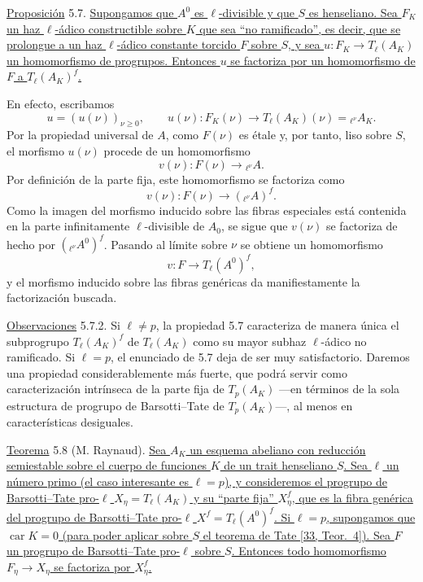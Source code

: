 

\par\medskip
\noindent
\underline{Proposición} 5.7. \underline{Supongamos que $A^0$ es
$\ell$-divisible y que $S$ es henseliano. Sea $F_K$ un haz
$\ell$-ádico constructible sobre $K$ que sea ``no ramificado'', es
decir, que se prolongue a un haz $\ell$-ádico constante torcido $F$
sobre $S$, y sea $u:F_K\longrightarrow T_\ell(A_K)$ un homomorfismo de
progrupos. Entonces $u$ se factoriza por un homomorfismo de $F$ a
$T_\ell(A_K)^f$.}

En efecto, escribamos
\begin{equation}\tag{5.7.1}
 u=(u(\nu))_{\nu\geqslant0},\qquad
 u(\nu):F_K(\nu)\longrightarrow T_\ell(A_K)(\nu)
 ={}_{\ell^\nu}A_K.
\end{equation}
Por la propiedad universal de $A$, como $F(\nu)$ es étale y, por
tanto, liso sobre $S$, el morfismo $u(\nu)$ procede de un homomorfismo
\[
 v(\nu):F(\nu)\longrightarrow{}_{\ell^\nu}A.
\]
Por definición de la parte fija, este homomorfismo se factoriza como
\[
 v(\nu):F(\nu)\longrightarrow({}_{\ell^\nu}A)^f.
\]
Como la imagen del morfismo inducido sobre las fibras especiales está
contenida en la parte infinitamente $\ell$-divisible de $A_0$, se sigue
que $v(\nu)$ se factoriza de hecho por
$({}_{\ell^\nu}A^0)^f$. Pasando al límite sobre $\nu$ se obtiene un
homomorfismo
\[
 v:F\longrightarrow T_\ell(A^0)^f,
\]
y el morfismo inducido sobre las fibras genéricas da manifiestamente la
factorización buscada.

\medskip
\noindent
\underline{Observaciones} 5.7.2. Si $\ell\neq p$, la propiedad 5.7
caracteriza de manera única el subprogrupo $T_\ell(A_K)^f$ de
$T_\ell(A_K)$ como su mayor subhaz $\ell$-ádico no ramificado. Si
$\ell=p$, el enunciado de 5.7 deja de ser muy satisfactorio. Daremos
una propiedad considerablemente más fuerte, que podrá servir como
caracterización intrínseca de la parte fija de $T_p(A_K)$ —en términos
de la sola estructura de progrupo de Barsotti--Tate de $T_p(A_K)$—, al
menos en características desiguales.


\medskip
\noindent
\underline{Teorema} 5.8 (M. Raynaud). \underline{Sea $A_K$ un esquema
abeliano con reducción semiestable sobre el cuerpo de funciones $K$ de
un trait henseliano $S$. Sea $\ell$ un número primo (el caso
interesante es $\ell=p$), y consideremos el progrupo de
Barsotti--Tate pro-$\ell$ $X_\eta=T_\ell(A_K)$ y su ``parte fija''
$X_\eta^f$, que es la fibra genérica del progrupo de Barsotti--Tate
pro-$\ell$ $X^f=T_\ell(A^0)^f$. Si $\ell=p$, supongamos que
$\operatorname{car}K=0$ (para poder aplicar sobre $S$ el teorema de
Tate [33, Teor.\ 4]). Sea $F$ un progrupo de Barsotti--Tate pro-$\ell$
sobre $S$. Entonces todo homomorfismo
$F_\eta\longrightarrow X_\eta$ se factoriza por $X_\eta^f$.}

